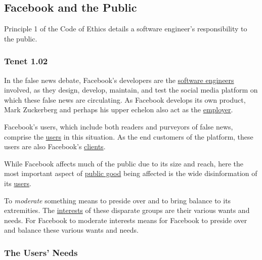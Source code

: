 
\subsection{Facebook and the Public}

\par Principle 1 of the Code of Ethics details a software engineer's responsibility to the public. \cite{se_code}

\subsubsection{Tenet 1.02}


\par In the false news debate, Facebook's developers are the \ul{software engineers} involved, as they design, develop, maintain, and test the social media platform on which these false news are circulating. As Facebook develops its own product, Mark Zuckerberg and perhaps his upper echelon also act as the \ul{employer}. 

\par Facebook's users, which include both readers and purveyors of false news, comprise the \ul{users} in this situation. As the end customers of the platform, these users are also Facebook's \ul{clients}.

\par While Facebook affects much of the public due to its size and reach, here the most important aspect of \ul{public good} being affected is the wide disinformation of its \ul{users}.

\par To \emph{moderate} something means to preside over and to bring balance to its extremities. \cite{dictionary} The \ul{interests} of these disparate groups are their various wants and needs. For Facebook to moderate interests means for Facebook to preside over and balance these various wants and needs. 


\subsubsection{The Users' Needs}

